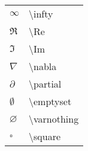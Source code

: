 \documentclass[14pt,a4paper]{extarticle}
\begin{document}
\begin{table}
\begin{subtable}{.24\textwidth}
\begin{tabular}{ p{1em} p{9em}  }
      \\ 

    \end{tabular}
  \end{subtable}
  \begin{subtable}{.24\textwidth}
    \begin{tabular}{ p{1em} p{9em}  }

      $\infty$ & \textbackslash infty \\
      $\Re$ & \textbackslash Re \\
      $\Im$ & \textbackslash Im \\
      $\nabla$ & \textbackslash nabla \\
      $\partial$ & \textbackslash partial \\
      $\emptyset$ & \textbackslash emptyset \\
      $\varnothing$ & \textbackslash varnothing \\
      $\square$ & \textbackslash square

    \end{tabular}
  \end{subtable}
\end{table}
\end{document}
